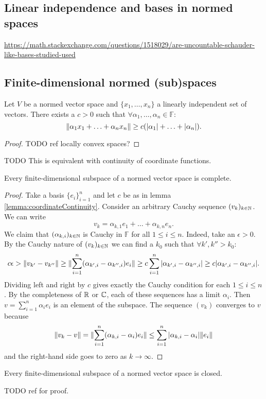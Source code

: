 \subsection{Linear independence and bases in normed spaces}
\url{https://math.stackexchange.com/questions/1518029/are-uncountable-schauder-like-bases-studied-used}

\subsection{Finite-dimensional normed (sub)spaces}

\begin{lemma} \label{lemma:coordinateContinuity}
Let $V$ be a normed vector space and $\{x_1, \ldots, x_n\}$ a linearly independent set of vectors. There exists a $c>0$ such that $\forall \alpha_1,\ldots, \alpha_n \in \mathbb{F}$:
\[ \lVert\alpha_1x_1 + \ldots + \alpha_nx_n\rVert \geq c(|\alpha_1|+\ldots+|\alpha_n|) . \]
\end{lemma}
\begin{proof}
TODO ref locally convex spaces?
\end{proof}
TODO This is equivalent with continuity of coordinate functions.

\begin{proposition} \label{prop:finiteDimComplete}
Every finite-dimensional subspace of a normed vector space is complete.
\end{proposition}
\begin{proof}
Take a basis $\{e_i\}_{i=1}^n$ and let $c$ be as in lemma \ref{lemma:coordinateContinuity}. Consider an arbitrary Cauchy sequence $(v_k)_{k\in\mathbb{N}}$. We can write
\[ v_k = \alpha_{k,1}e_1 + \ldots + \alpha_{k,n}e_n. \]
We claim that $(\alpha_{k,i})_{k\in\mathbb{N}}$ is Cauchy in $\mathbb{F}$ for all $1\leq i\leq n$. Indeed, take an $\epsilon>0$. By the Cauchy nature of $(v_k)_{k\in\mathbb{N}}$ we can find a $k_0$ such that $\forall k', k''>k_0:$
\[ c\epsilon > \lVert v_{k'} - v_{k''}\rVert \geq \lVert\sum_{i=1}^n (\alpha_{k',i}-\alpha_{k'',i})e_i\rVert\geq c\sum_{i=1}^n |\alpha_{k',i}-\alpha_{k'',i}| \geq c |\alpha_{k',i}-\alpha_{k'',i}|. \]
Dividing left and right by $c$ gives exactly the Cauchy condition for each $1\leq i\leq n$. By the completeness of $\mathbb{R}$ or $\mathbb{C}$, each of these sequences has a limit $\alpha_i$.
Then $v= \sum_{i=1}^n\alpha_ie_i$ is an element of the subspace. The sequence $(v_k)$ converges to $v$ because
\[ \lVert v_k-v\rVert = \lVert\sum_{i=1}^n (\alpha_{k,i}-\alpha_i)e_i\rVert \leq \sum_{i=1}^n |\alpha_{k,i}-\alpha_i|\lVert e_i\rVert \]
and the right-hand side goes to zero as $k\to \infty$.
\end{proof}
\begin{corollary} \label{corollary:finiteDimClosed}
Every finite-dimensional subspace of a normed vector space is closed.
\end{corollary}
TODO ref for proof.

